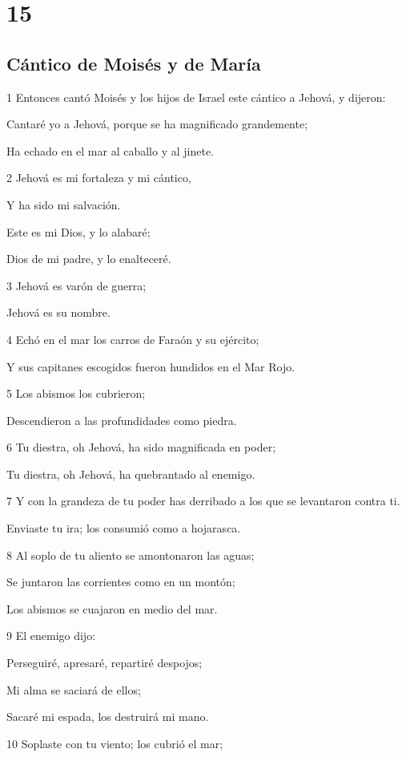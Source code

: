 \chapter{15}

\section*{Cántico de Moisés y de María}

\par 1 Entonces cantó Moisés y los hijos de Israel este cántico a Jehová, y dijeron:
\par Cantaré yo a Jehová, porque se ha magnificado grandemente;
\par Ha echado en el mar al caballo y al jinete.
\par 2 Jehová es mi fortaleza y mi cántico,
\par Y ha sido mi salvación.
\par Este es mi Dios, y lo alabaré;
\par Dios de mi padre, y lo enalteceré.
\par 3 Jehová es varón de guerra;
\par Jehová es su nombre.
\par 4 Echó en el mar los carros de Faraón y su ejército;
\par Y sus capitanes escogidos fueron hundidos en el Mar Rojo.
\par 5 Los abismos los cubrieron;
\par Descendieron a las profundidades como piedra.
\par 6 Tu diestra, oh Jehová, ha sido magnificada en poder;
\par Tu diestra, oh Jehová, ha quebrantado al enemigo.
\par 7 Y con la grandeza de tu poder has derribado a los que se levantaron contra ti.
\par Enviaste tu ira; los consumió como a hojarasca.
\par 8 Al soplo de tu aliento se amontonaron las aguas;
\par Se juntaron las corrientes como en un montón;
\par Los abismos se cuajaron en medio del mar.
\par 9 El enemigo dijo:
\par Perseguiré, apresaré, repartiré despojos;
\par Mi alma se saciará de ellos;
\par Sacaré mi espada, los destruirá mi mano.
\par 10 Soplaste con tu viento; los cubrió el mar;
